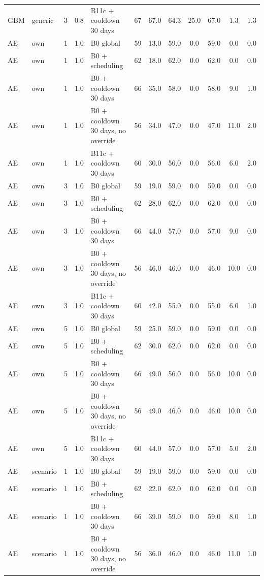 \begin{longtable}{lllllccccccc}
GBM & generic & 3 & 0.8 & B11c + cooldown 30 days & 67 & 67.0 & 64.3 & 25.0 & 67.0 & 1.3 & 1.3 \\
AE & own & 1 & 1.0 & B0 global & 59 & 13.0 & 59.0 & 0.0 & 59.0 & 0.0 & 0.0 \\
AE & own & 1 & 1.0 & B0 + scheduling & 62 & 18.0 & 62.0 & 0.0 & 62.0 & 0.0 & 0.0 \\
AE & own & 1 & 1.0 & B0 + cooldown 30 days & 66 & 35.0 & 58.0 & 0.0 & 58.0 & 9.0 & 1.0 \\
AE & own & 1 & 1.0 & B0 + cooldown 30 days, no override & 56 & 34.0 & 47.0 & 0.0 & 47.0 & 11.0 & 2.0 \\
AE & own & 1 & 1.0 & B11c + cooldown 30 days & 60 & 30.0 & 56.0 & 0.0 & 56.0 & 6.0 & 2.0 \\
AE & own & 3 & 1.0 & B0 global & 59 & 19.0 & 59.0 & 0.0 & 59.0 & 0.0 & 0.0 \\
AE & own & 3 & 1.0 & B0 + scheduling & 62 & 28.0 & 62.0 & 0.0 & 62.0 & 0.0 & 0.0 \\
AE & own & 3 & 1.0 & B0 + cooldown 30 days & 66 & 44.0 & 57.0 & 0.0 & 57.0 & 9.0 & 0.0 \\
AE & own & 3 & 1.0 & B0 + cooldown 30 days, no override & 56 & 46.0 & 46.0 & 0.0 & 46.0 & 10.0 & 0.0 \\
AE & own & 3 & 1.0 & B11c + cooldown 30 days & 60 & 42.0 & 55.0 & 0.0 & 55.0 & 6.0 & 1.0 \\
AE & own & 5 & 1.0 & B0 global & 59 & 25.0 & 59.0 & 0.0 & 59.0 & 0.0 & 0.0 \\
AE & own & 5 & 1.0 & B0 + scheduling & 62 & 30.0 & 62.0 & 0.0 & 62.0 & 0.0 & 0.0 \\
AE & own & 5 & 1.0 & B0 + cooldown 30 days & 66 & 49.0 & 56.0 & 0.0 & 56.0 & 10.0 & 0.0 \\
AE & own & 5 & 1.0 & B0 + cooldown 30 days, no override & 56 & 49.0 & 46.0 & 0.0 & 46.0 & 10.0 & 0.0 \\
AE & own & 5 & 1.0 & B11c + cooldown 30 days & 60 & 44.0 & 57.0 & 0.0 & 57.0 & 5.0 & 2.0 \\
AE & scenario & 1 & 1.0 & B0 global & 59 & 19.0 & 59.0 & 0.0 & 59.0 & 0.0 & 0.0 \\
AE & scenario & 1 & 1.0 & B0 + scheduling & 62 & 22.0 & 62.0 & 0.0 & 62.0 & 0.0 & 0.0 \\
AE & scenario & 1 & 1.0 & B0 + cooldown 30 days & 66 & 39.0 & 59.0 & 0.0 & 59.0 & 8.0 & 1.0 \\
AE & scenario & 1 & 1.0 & B0 + cooldown 30 days, no override & 56 & 36.0 & 46.0 & 0.0 & 46.0 & 11.0 & 1.0 \\

\end{longtable}
